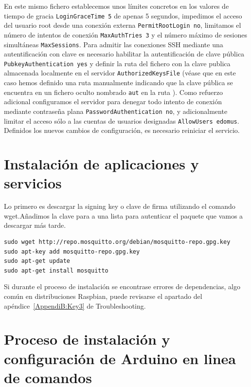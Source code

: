 \vspace{1cm}

En este mismo fichero establecemos unos límites concretos en los valores de tiempo de gracia \verb|LoginGraceTime 5| de apenas 5 segundos, impedimos el acceso del usuario root desde una conexión externa \verb|PermitRootLogin no|, limitamos el número de intentos de conexión \verb|MaxAuthTries 3| y el número máximo de sesiones simultáneas \verb|MaxSessions|. Para admitir las conexiones SSH mediante una autentificación con clave es necesario habilitar la autentificación de clave pública \verb|PubkeyAuthentication yes| y definir la ruta del fichero con la clave publica almacenada localmente en el servidor \verb|AuthorizedKeysFile|  (véase que en este caso hemos definido una ruta manualmente indicando que la clave pública se encuentra en un fichero oculto nombrado \verb|aut| en la ruta ). Como refuerzo adicional configuramos el servidor para denegar todo intento de conexión mediante contraseña plana \verb|PasswordAuthentication no|, y adicionalmente limitar el acceso sólo a las cuentas de usuarios designadas \verb|AllowUsers edomus|. Definidos los nuevos cambios de configuración, es necesario reiniciar el servicio.


\label{AppendiA:Key3}
\section{Instalación de aplicaciones y servicios}
Lo primero es descargar la signing key o clave de firma utilizando el comando wget.Añadimos la clave para a una lista para autenticar el paquete que vamos a descargar más tarde.

\begin{verbatim}
sudo wget http://repo.mosquitto.org/debian/mosquitto-repo.gpg.key
sudo apt-key add mosquitto-repo.gpg.key
sudo apt-get update 
sudo apt-get install mosquitto
\end{verbatim}

Si durante el proceso de instalación se encontrase errores de dependencias, algo común en distribuciones Raspbian, puede revisarse el apartado del apéndice~\ref{AppendiB:Key3} de Troubleshooting.


\section{Proceso de instalación y configuración de Arduino en linea de comandos}
\label{AppendiA:Key4}

